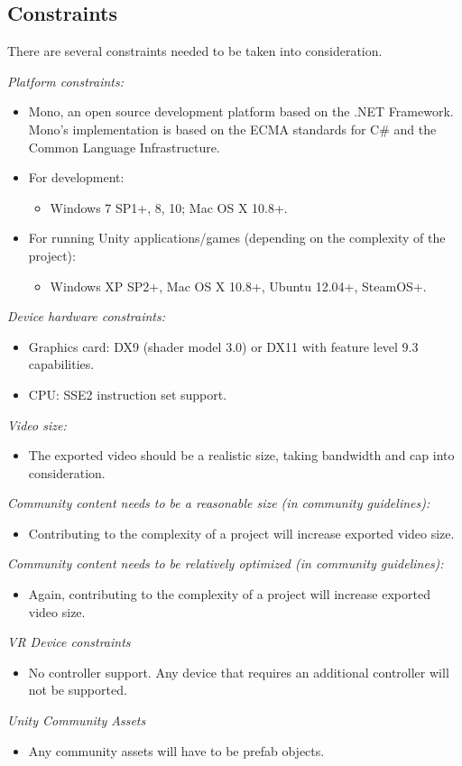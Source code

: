 \documentclass{article}
\begin{document}
\subsection{Constraints}
There are several constraints needed to be taken into consideration.
\bigskip
\begin{flushleft}
\textsl{Platform constraints:}
\end{flushleft}
	\begin{itemize}
		\item Mono, an open source development platform based on the .NET Framework. Mono’s implementation is based on the ECMA standards for C\# and the Common Language Infrastructure.
		\item For development:
			\begin{itemize}
				\item Windows 7 SP1+, 8, 10; Mac OS X 10.8+.
			\end{itemize}
		\item For running Unity applications/games (depending on the complexity of the project):
			\begin{itemize}
				\item Windows XP SP2+, Mac OS X 10.8+, Ubuntu 12.04+, SteamOS+.
			\end{itemize}
	\end{itemize}
\medskip
\textsl{Device hardware constraints:}
	\begin{itemize}
		\item Graphics card: DX9 (shader model 3.0) or DX11 with feature level 9.3 capabilities.
		\item CPU: SSE2 instruction set support.
	\end{itemize}
\medskip
\textsl{Video size:}
	\begin{itemize}
		\item The exported video should be a realistic size, taking bandwidth and cap into consideration.
	\end{itemize}
\medskip
\textsl{Community content needs to be a reasonable size (in community guidelines):}
	\begin{itemize}
		\item Contributing to the complexity of a project will increase exported video size.
	\end{itemize}
\medskip
\textsl{Community content needs to be relatively optimized (in community guidelines):}
	\begin{itemize}
		\item Again, contributing to the complexity of a project will increase exported video size.
	\end{itemize}
\medskip
\textsl{VR Device constraints}
	\begin{itemize}
		\item No controller support. Any device that requires an additional controller will not be supported.
	\end{itemize}
\medskip
\textsl{Unity Community Assets}
	\begin{itemize}
		\item Any community assets will have to be prefab objects.
	\end{itemize}
\end{document}
